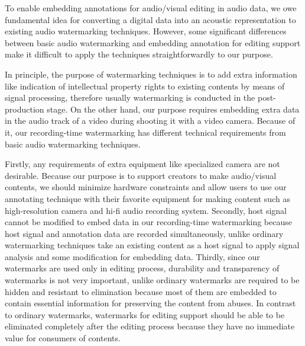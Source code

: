To enable embedding annotations for audio/visual editing in audio data, we owe fundamental idea for converting a digital data into an acoustic representation to existing audio watermarking techniques.
However, some significant differences between basic audio watermarking and embedding annotation for editing support make it difficult to apply the techniques straightforwardly to our purpose.

In principle, the purpose of watermarking techniques is to add extra information like indication of intellectual property rights to existing contents by means of signal processing, therefore usually watermarking is conducted in the post-production stage.
On the other hand, our purpose requires embedding extra data in the audio track of a video during shooting it with a video camera. %
Because of it, our recording-time watermarking has different technical requirements from basic audio watermarking techniques.

Firstly, any requirements of extra equipment like specialized camera are not desirable.
Because our purpose is to support creators to make audio/visual contents, we should minimize hardware constraints and allow users to use our annotating technique with their favorite equipment for making content such as high-resolution camera and hi-fi audio recording system.
Secondly, host signal cannot be modified to embed data in our recording-time watermarking because host signal and annotation data are recorded simultaneously, unlike ordinary watermarking techniques take an existing content as a host signal to apply signal analysis and some modification for embedding data.
Thirdly, since our watermarks are used only in editing process, durability and transparency of watermarks is not very important, unlike ordinary watermarks are required to be hidden and resistant to elimination because most of them are embedded to contain essential information for preserving the content from abuses.
In contrast to ordinary watermarks, watermarks for editing support should be able to be eliminated completely after the editing process because they have no immediate value for consumers of contents.

